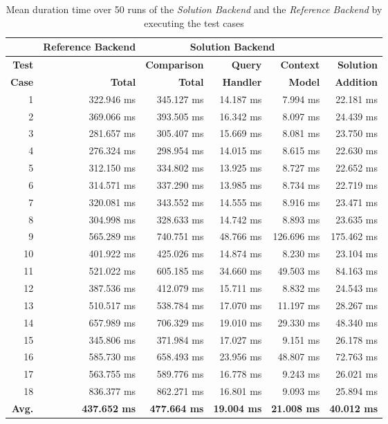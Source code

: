 \documentclass[draft,final]{vutinfth} %
\begin{document}
\begin{table}[]
	\caption{Mean duration time over 50 runs of the \textit{Solution Backend} and the \textit{Reference Backend} by executing the test cases}
	\begin{tabular}{r|r|r|r|r|r}
		
		\textbf{} & \textbf{Reference Backend} & \multicolumn{3}{c|}{\textbf{Solution Backend}} &  \\ \hline \textbf{Test} & \textbf{} & \textbf{Comparison} & \textbf{Query} & \textbf{Context} & \textbf{Solution} \\ 
		\textbf{Case} & \textbf{Total} & \textbf{Total} & \textbf{Handler} & \textbf{Model} & \textbf{Addition} \\ \hline
		1 & 322.946 ms & 345.127 ms & 14.187 ms & 7.994 ms & 22.181 ms \\ 
		2 & 369.066 ms & 393.505 ms & 16.342 ms & 8.097 ms & 24.439 ms \\ 
		3 & 281.657 ms & 305.407 ms & 15.669 ms & 8.081 ms & 23.750 ms \\ 
		4 & 276.324 ms & 298.954 ms & 14.015 ms & 8.615 ms & 22.630 ms \\ 
		5 & 312.150 ms & 334.802 ms & 13.925 ms & 8.727 ms & 22.652 ms \\ 
		6 & 314.571 ms & 337.290 ms & 13.985 ms & 8.734 ms & 22.719 ms \\ 
		7 & 320.081 ms & 343.552 ms & 14.555 ms & 8.916 ms & 23.471 ms \\ 
		8 & 304.998 ms & 328.633 ms & 14.742 ms & 8.893 ms & 23.635 ms \\ 
		9 & 565.289 ms & 740.751 ms & 48.766 ms & 126.696 ms & 175.462 ms \\ 
		10 & 401.922 ms & 425.026 ms & 14.874 ms & 8.230 ms & 23.104 ms \\ 
		11 & 521.022 ms & 605.185 ms & 34.660 ms & 49.503 ms & 84.163 ms \\ 
		12 & 387.536 ms & 412.079 ms & 15.711 ms & 8.832 ms & 24.543 ms \\ 
		13 & 510.517 ms & 538.784 ms & 17.070 ms & 11.197 ms & 28.267 ms \\ 
		14 & 657.989 ms & 706.329 ms & 19.010 ms & 29.330 ms & 48.340 ms  \\ 
		15 & 345.806 ms & 371.984 ms & 17.027 ms & 9.151 ms & 26.178 ms \\ 
		16 & 585.730 ms & 658.493 ms & 23.956 ms & 48.807 ms & 72.763 ms \\ 
		17 & 563.755 ms & 589.776 ms & 16.778 ms & 9.243 ms & 26.021 ms \\ 
		18 & 836.377 ms & 862.271 ms & 16.801 ms & 9.093 ms & 25.894 ms \\ \hline
		\textbf{Avg.} & \textbf{437.652 ms} & \textbf{477.664 ms} & \textbf{19.004 ms} & \textbf{21.008 ms} & \textbf{40.012 ms} \\ 
	\end{tabular}
	\label{Tab:eva_performance}
\end{table}
\end{document}
